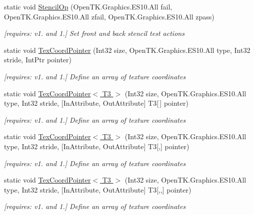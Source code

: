 \begin{DoxyCompactItemize}
static void \hyperlink{class_open_t_k_1_1_graphics_1_1_e_s10_1_1_g_l_a9f64346c0b8d06a7acaf087c6f719604}{Stencil\-Op} (Open\-T\-K.\-Graphics.\-E\-S10.\-All fail, Open\-T\-K.\-Graphics.\-E\-S10.\-All zfail, Open\-T\-K.\-Graphics.\-E\-S10.\-All zpass)
\begin{DoxyCompactList}\small\item\em \mbox{[}requires\-: v1. and 1.\mbox{]} Set front and back stencil test actions \end{DoxyCompactList}\item 
static void \hyperlink{class_open_t_k_1_1_graphics_1_1_e_s10_1_1_g_l_ac1b9ade1ae9dc84d93cb2a062773d45f}{Tex\-Coord\-Pointer} (Int32 size, Open\-T\-K.\-Graphics.\-E\-S10.\-All type, Int32 stride, Int\-Ptr pointer)
\begin{DoxyCompactList}\small\item\em \mbox{[}requires\-: v1. and 1.\mbox{]} Define an array of texture coordinates \end{DoxyCompactList}\item 
static void \hyperlink{class_open_t_k_1_1_graphics_1_1_e_s10_1_1_g_l_a77b4f31ffbebd9efdb04d5d28df661fc}{Tex\-Coord\-Pointer$<$ T3 $>$} (Int32 size, Open\-T\-K.\-Graphics.\-E\-S10.\-All type, Int32 stride, \mbox{[}In\-Attribute, Out\-Attribute\mbox{]} T3\mbox{[}$\,$\mbox{]} pointer)
\begin{DoxyCompactList}\small\item\em \mbox{[}requires\-: v1. and 1.\mbox{]} Define an array of texture coordinates \end{DoxyCompactList}\item 
static void \hyperlink{class_open_t_k_1_1_graphics_1_1_e_s10_1_1_g_l_a24bbbeff904bc4d184cf97f334cd7a25}{Tex\-Coord\-Pointer$<$ T3 $>$} (Int32 size, Open\-T\-K.\-Graphics.\-E\-S10.\-All type, Int32 stride, \mbox{[}In\-Attribute, Out\-Attribute\mbox{]} T3\mbox{[},\mbox{]} pointer)
\begin{DoxyCompactList}\small\item\em \mbox{[}requires\-: v1. and 1.\mbox{]} Define an array of texture coordinates \end{DoxyCompactList}\item 
static void \hyperlink{class_open_t_k_1_1_graphics_1_1_e_s10_1_1_g_l_a830b946f4fa83bce61cdf46b0968c28f}{Tex\-Coord\-Pointer$<$ T3 $>$} (Int32 size, Open\-T\-K.\-Graphics.\-E\-S10.\-All type, Int32 stride, \mbox{[}In\-Attribute, Out\-Attribute\mbox{]} T3\mbox{[},,\mbox{]} pointer)
\begin{DoxyCompactList}\small\item\em \mbox{[}requires\-: v1. and 1.\mbox{]} Define an array of texture coordinates \end{DoxyCompactList}\item 

\end{DoxyCompactItemize}
